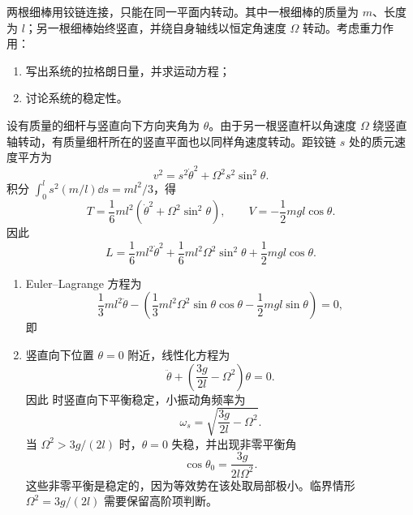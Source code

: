 \begin{question}[铰接细棒的稳定性]
两根细棒用铰链连接，只能在同一平面内转动。其中一根细棒的质量为 $m$、长度为 $l$；另一根细棒始终竖直，并绕自身轴线以恒定角速度 $\Omega$ 转动。考虑重力作用：
\begin{enumerate}
  \item 写出系统的拉格朗日量，并求运动方程；
  \item 讨论系统的稳定性。
\end{enumerate}

\begin{solution}
设有质量的细杆与竖直向下方向夹角为 $\theta$。由于另一根竖直杆以角速度 $\Omega$ 绕竖直轴转动，有质量细杆所在的竖直平面也以同样角速度转动。距铰链 $s$ 处的质元速度平方为
\[
  v^2=s^2\dot\theta^2+\Omega^2s^2\sin^2\theta .
\]
积分 $\int_0^l s^2(m/l)\dd s=ml^2/3$，得
\[
  T=\frac16ml^2\left(\dot\theta^2+\Omega^2\sin^2\theta\right),
  \qquad
  V=-\frac12mgl\cos\theta .
\]
因此
\[
  L=\frac16ml^2\dot\theta^2+\frac16ml^2\Omega^2\sin^2\theta
  +\frac12mgl\cos\theta .
\]
\begin{enumerate}
  \item Euler--Lagrange 方程为
  \[
    \frac13ml^2\ddot\theta
    -\left(\frac13ml^2\Omega^2\sin\theta\cos\theta
    -\frac12mgl\sin\theta\right)=0,
  \]
  即
  \item 竖直向下位置 $\theta=0$ 附近，线性化方程为
  \[
    \ddot\theta+\left(\frac{3g}{2l}-\Omega^2\right)\theta=0.
  \]
  因此
  时竖直向下平衡稳定，小振动角频率为
  \[
    \omega_s=\sqrt{\frac{3g}{2l}-\Omega^2}.
  \]
  当 $\Omega^2>3g/(2l)$ 时，$\theta=0$ 失稳，并出现非零平衡角
  \[
    \cos\theta_0=\frac{3g}{2l\Omega^2}.
  \]
  这些非零平衡是稳定的，因为等效势在该处取局部极小。临界情形 $\Omega^2=3g/(2l)$ 需要保留高阶项判断。
\end{enumerate}
\end{solution}

\end{question}

